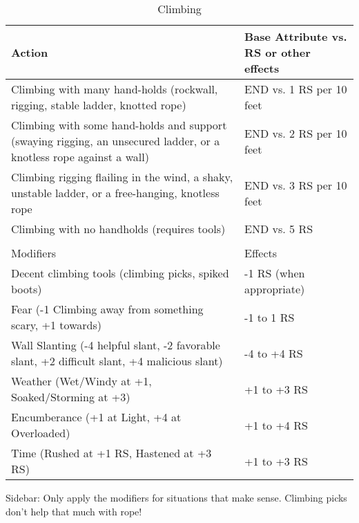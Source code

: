 \documentclass[oneside,11pt,english]{book}
\begin{document}
\begin{longtabu} to \linewidth{X[1.65]X[r]}
	\caption{Climbing}
	\label{tab:Climbing Skill}\\
		\rowfont[c]{}Action &Base Attribute vs. RS or other effects\\\toprule
Climbing with many hand-holds (rockwall, rigging, stable ladder, knotted rope) & END vs. 1 RS per 10 feet\\
Climbing with some hand-holds and support (swaying rigging, an unsecured ladder, or a knotless rope against a wall) &END vs. 2 RS per 10 feet\\
Climbing rigging flailing in the wind, a shaky, unstable ladder, or a free-hanging, knotless rope&END vs. 3 RS per 10 feet\\
Climbing with no handholds (requires tools) &END vs. 5 RS\\
	\\
		\rowfont[c]{}Modifiers &Effects\\
Decent climbing tools (climbing picks, spiked boots) &-1 RS (when appropriate)\\
Fear (-1 Climbing away from something scary, +1 towards) &-1 to 1 RS\\
Wall Slanting (-4 helpful slant, -2 favorable slant, +2 difficult slant, +4 malicious slant)& -4 to +4 RS\\
Weather (Wet/Windy at +1, Soaked/Storming at +3)&+1 to +3 RS\\
Encumberance (+1 at Light, +4 at Overloaded)&+1 to +4 RS\\
Time (Rushed at +1 RS, Hastened at +3 RS)&+1 to +3 RS\\
\end{longtabu}
Sidebar: Only apply the modifiers for situations that make sense. Climbing picks don’t help that much with rope!
\end{document}
